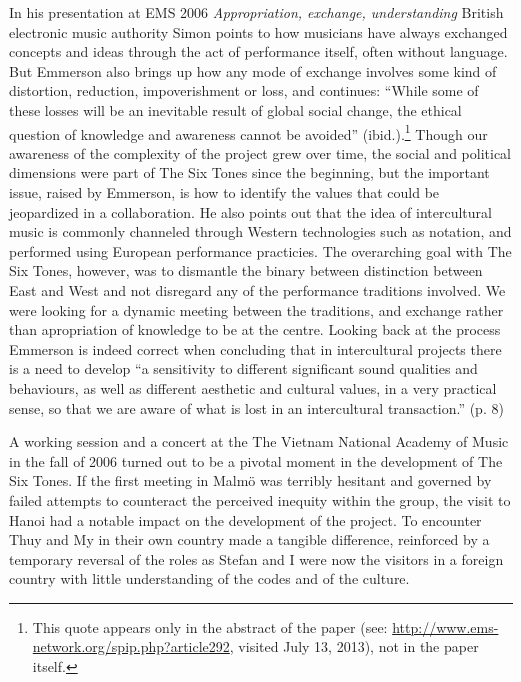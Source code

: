 \documentclass[a4paper]{article}
\begin{document}
In his presentation at EMS 2006 \emph{Appropriation, exchange, understanding} British electronic music authority Simon \citet{emmerson06} points to how musicians have always exchanged concepts and ideas through the act of performance itself, often without language. But Emmerson also brings up how any mode of exchange involves some kind of distortion, reduction, impoverishment or loss, and continues: ``While some of these losses will be an inevitable result of global social change, the ethical question of knowledge and awareness cannot be avoided'' (ibid.).\footnote{This quote appears only in the abstract of the paper (see: \url{http://www.ems-network.org/spip.php?article292}, visited July 13, 2013), not in the paper itself.} Though our awareness of the complexity of the project grew over time, the social and political dimensions were part of The Six Tones since the beginning, but the important issue, raised by Emmerson, is how to identify the values that could be jeopardized in a collaboration. He also points out that the idea of intercultural music is commonly channeled through Western technologies such as notation, and performed using European performance practicies. The overarching goal with The Six Tones, however, was to dismantle the binary between distinction between East and West and not disregard any of the  performance traditions involved. We were looking for a dynamic meeting between the traditions, and exchange rather than apropriation of knowledge to be at the centre. Looking back at the process Emmerson is indeed correct when concluding that in intercultural projects there is a need to develop ``a sensitivity to different significant sound qualities and behaviours, as well as different aesthetic and cultural values, in a very practical sense, so that we are aware of what is lost in an intercultural transaction.'' (p. 8)


A working session and a concert at the The Vietnam National Academy of Music in the fall of 2006 turned out to be a pivotal moment in the development of The Six Tones. If the first meeting in Malmö was terribly hesitant and governed by failed attempts to counteract the perceived inequity within the group, the visit to Hanoi had a notable impact on the development of the project. To encounter Thuy and My in their own country made a tangible difference, reinforced by a temporary reversal of the roles as Stefan and I were now the visitors in a foreign country with little understanding of the codes and of the culture.
\end{document}
